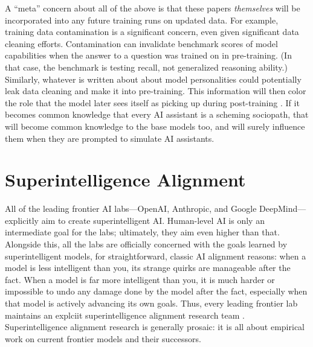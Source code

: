 A ``meta'' concern about all of the above is that these papers
\emph{themselves} will be incorporated into any future training runs on updated
data. For example, training data contamination is a significant concern, even
given significant data cleaning efforts. Contamination can invalidate benchmark
scores of model capabilities when the answer to a question was trained on in
pre-training. (In that case, the benchmark is testing recall, not generalized
reasoning ability.) Similarly, whatever is written about about model
personalities could potentially leak data cleaning and make it into
pre-training. This information will then color the role that the model later
sees itself as picking up during post-training \cite{nostalgebraist2025void}.
If it becomes common knowledge that every AI assistant is a scheming sociopath,
that will become common knowledge to the base models too, and will surely
influence them when they are prompted to simulate AI assistants.

\section{Superintelligence Alignment}
All of the leading frontier AI labs---OpenAI, Anthropic, and Google
DeepMind---explicitly aim to create superintelligent AI. Human-level AI is only
an intermediate goal for the labs; ultimately, they aim even higher than that.
Alongside this, all the labs are officially concerned with the goals learned by
superintelligent models, for straightforward, classic AI alignment reasons:
when a model is less intelligent than you, its strange quirks are manageable
after the fact. When a model is far more intelligent than you, it is much
harder or impossible to undo any damage done by the model after the fact,
especially when that model is actively advancing its own goals. Thus, every
leading frontier lab maintains an explciit superintelligence alignment research
team \cite{leike2023superalignment, anthropic2025rsp}. Superintelligence
alignment research is generally prosaic: it is all about empirical work on
current frontier models and their successors.

